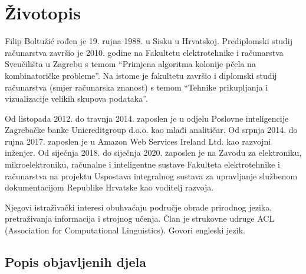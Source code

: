 \renewcommand{\leftmark}{Životopis}
\chapter*{Životopis}


Filip Boltužić rođen je 19. rujna 1988. u Sisku u Hrvatskoj. Prediplomski
studij računarstva završio je 2010. godine na Fakultetu elektrotehnike i računarstva
Sveučilišta u Zagrebu s temom ``Primjena algoritma kolonije pčela na kombinatoričke probleme''. 
Na istome je fakultetu završio i diplomski studij računarstva
(smjer računarska znanost) s temom ``Tehnike prikupljanja i vizualizacije
velikih skupova podataka''. 

Od listopada 2012. do travnja 2014. zaposlen je u odjelu Poslovne inteligencije 
Zagrebačke banke Unicreditgroup d.o.o. kao 
mlađi analitičar. Od srpnja 2014. do rujna 2017. zaposlen je 
u Amazon Web Services Ireland Ltd. kao razvojni inženjer. 
Od siječnja 2018. do siječnja 2020. 
zaposlen je na Zavodu za elektroniku, mikroelektroniku, računalne
i inteligentne sustave Fakulteta elektrotehnike i računarstva  
na projektu Uspostava integralnog sustava za 
upravljanje službenom dokumentacijom Republike Hrvatske kao voditelj razvoja.

Njegovi istraživački interesi obuhvaćaju područje obrade prirodnog jezika,
pretraživanja informacija i strojnog učenja. 
Član je strukovne udruge ACL (Association for Computational Linguistics). 
Govori engleski jezik.

\section*{Popis objavljenih djela}

% 
% 

